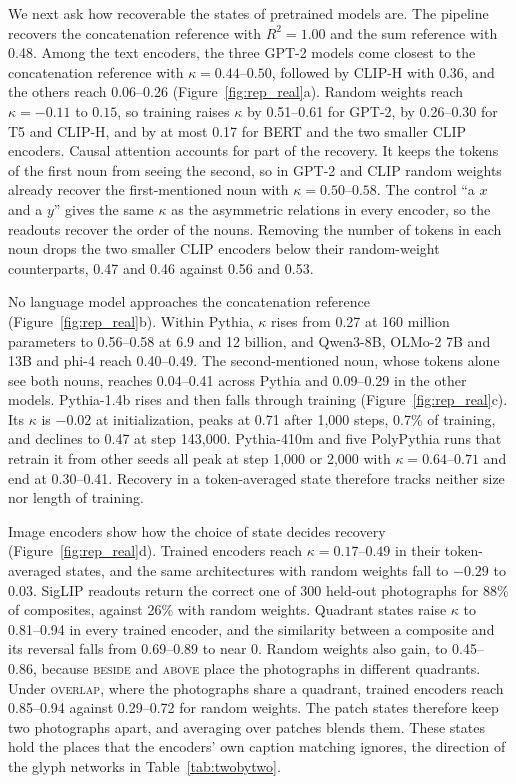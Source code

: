 \documentclass[10pt]{article}
\theoremstyle{plain}
\theoremstyle{remark}
\begin{document}
We next ask how recoverable the states of pretrained models are. The pipeline recovers the concatenation reference with $R^2 = 1.00$ and the sum reference with 0.48. Among the text encoders, the three GPT-2 models come closest to the concatenation reference with $\kappa = 0.44$--$0.50$, followed by CLIP-H with 0.36, and the others reach 0.06--0.26 (Figure~\ref{fig:rep_real}a). Random weights reach $\kappa = -0.11$ to $0.15$, so training raises $\kappa$ by 0.51--0.61 for GPT-2, by 0.26--0.30 for T5 and CLIP-H, and by at most 0.17 for BERT and the two smaller CLIP encoders. Causal attention accounts for part of the recovery. It keeps the tokens of the first noun from seeing the second, so in GPT-2 and CLIP random weights already recover the first-mentioned noun with $\kappa = 0.50$--$0.58$. The control ``a $x$ and a $y$'' gives the same $\kappa$ as the asymmetric relations in every encoder, so the readouts recover the order of the nouns. Removing the number of tokens in each noun drops the two smaller CLIP encoders below their random-weight counterparts, 0.47 and 0.46 against 0.56 and 0.53.

\label{sec:llm}No language model approaches the concatenation reference (Figure~\ref{fig:rep_real}b). Within Pythia, $\kappa$ rises from 0.27 at 160 million parameters to 0.56--0.58 at 6.9 and 12 billion, and Qwen3-8B, OLMo-2 7B and 13B and phi-4 reach 0.40--0.49. The second-mentioned noun, whose tokens alone see both nouns, reaches 0.04--0.41 across Pythia and 0.09--0.29 in the other models. Pythia-1.4b rises and then falls through training (Figure~\ref{fig:rep_real}c). Its $\kappa$ is $-0.02$ at initialization, peaks at 0.71 after 1{,}000 steps, 0.7\% of training, and declines to 0.47 at step 143{,}000. Pythia-410m and five PolyPythia runs that retrain it from other seeds all peak at step 1{,}000 or 2{,}000 with $\kappa = 0.64$--$0.71$ and end at 0.30--0.41. Recovery in a token-averaged state therefore tracks neither size nor length of training.

\label{sec:vision}Image encoders show how the choice of state decides recovery (Figure~\ref{fig:rep_real}d). Trained encoders reach $\kappa = 0.17$--$0.49$ in their token-averaged states, and the same architectures with random weights fall to $-0.29$ to $0.03$. SigLIP readouts return the correct one of 300 held-out photographs for 88\% of composites, against 26\% with random weights. Quadrant states raise $\kappa$ to 0.81--0.94 in every trained encoder, and the similarity between a composite and its reversal falls from 0.69--0.89 to near 0. Random weights also gain, to 0.45--0.86, because \textsc{beside} and \textsc{above} place the photographs in different quadrants. Under \textsc{overlap}, where the photographs share a quadrant, trained encoders reach 0.85--0.94 against 0.29--0.72 for random weights. The patch states therefore keep two photographs apart, and averaging over patches blends them. These states hold the places that the encoders' own caption matching ignores, the direction of the glyph networks in Table~\ref{tab:twobytwo}.
\end{document}
